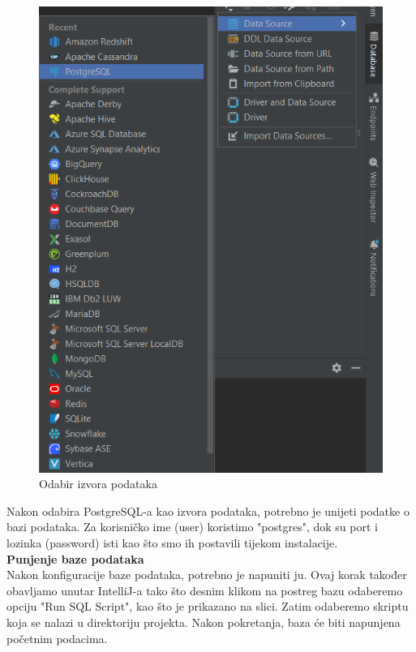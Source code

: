 			\begin{figure}[H]
				\includegraphics[scale=0.3]{slike/postgreSql.png} 
				\centering
				\caption{Odabir izvora podataka}
				\label{fig:promjene}
			\end{figure}
			Nakon odabira PostgreSQL-a kao izvora podataka, potrebno je unijeti podatke o bazi podataka. Za korisničko ime (user) koristimo "postgres", dok su port i lozinka (password) isti kao što smo ih postavili tijekom instalacije.
			\\
			\textbf{Punjenje baze podataka}
			\\
			Nakon konfiguracije baze podataka, potrebno je napuniti ju. Ovaj korak također obavljamo unutar IntelliJ-a tako što desnim klikom na postreg bazu odaberemo opciju "Run SQL Script", kao što je prikazano na slici. Zatim odaberemo skriptu koja se nalazi u direktoriju projekta. Nakon pokretanja, baza će biti napunjena početnim podacima.
			
